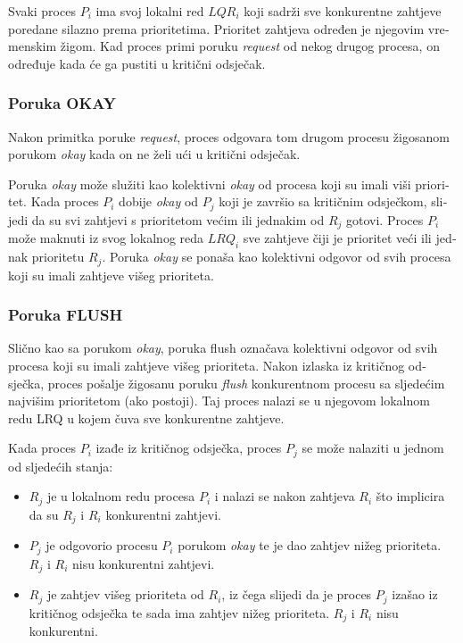 \documentclass[12pt]{rectors}
\begin{document}
\begin{otherlanguage}{croatian}
Svaki proces $P_i$ ima svoj lokalni red $LQR_i$ koji sadrži sve konkurentne zahtjeve poredane silazno prema prioritetima. Prioritet zahtjeva određen je njegovim vremenskim žigom. Kad proces primi poruku \textit{request} od nekog drugog procesa, on određuje kada će ga pustiti u kritični odsječak.

\subsubsection{Poruka OKAY}

Nakon primitka poruke \textit{request}, proces odgovara tom drugom procesu žigosanom porukom \textit{okay} kada on ne želi ući u kritični odsječak. 

Poruka \textit{okay} može služiti kao kolektivni \textit{okay} od procesa koji su imali viši prioritet. Kada proces $P_i$ dobije \textit{okay} od $P_j$ koji je završio sa kritičnim odsječkom, slijedi da su svi zahtjevi s prioritetom većim ili jednakim od $R_j$ gotovi. Proces $P_i$ može maknuti iz svog lokalnog reda $LRQ_i$ sve zahtjeve čiji je prioritet veći ili jednak prioritetu $R_j$. Poruka \textit{okay} se ponaša kao kolektivni odgovor od svih procesa koji su imali zahtjeve višeg prioriteta.

\subsubsection{Poruka FLUSH}
Slično kao sa porukom \textit{okay}, poruka flush označava kolektivni odgovor od svih procesa koji su imali zahtjeve višeg prioriteta. Nakon izlaska iz kritičnog odsječka, proces pošalje žigosanu poruku \textit{flush} konkurentnom procesu sa sljedećim najvišim prioritetom (ako postoji). Taj proces nalazi se u njegovom lokalnom redu LRQ u kojem čuva sve konkurentne zahtjeve.

Kada proces $P_i$ izađe iz kritičnog odsječka, proces $P_j$ se može nalaziti u jednom od sljedećih stanja:

\begin{itemize}
	\item $R_j$ je u lokalnom redu procesa $P_i$ i nalazi se nakon zahtjeva $R_i$ što implicira da su $R_j$ i $R_i$ konkurentni zahtjevi. 
	\item $P_j$ je odgovorio procesu $P_i$ porukom \textit{okay} te je dao zahtjev nižeg prioriteta. $R_j$ i $R_i$ nisu konkurentni zahtjevi.
	\item $R_j$ je zahtjev višeg prioriteta od $R_i$, iz čega slijedi da je proces $P_j$ izašao iz kritičnog odsječka te sada ima zahtjev nižeg prioriteta. $R_j$ i $R_i$ nisu konkurentni.
\end{itemize}


\end{otherlanguage}
\end{document}
